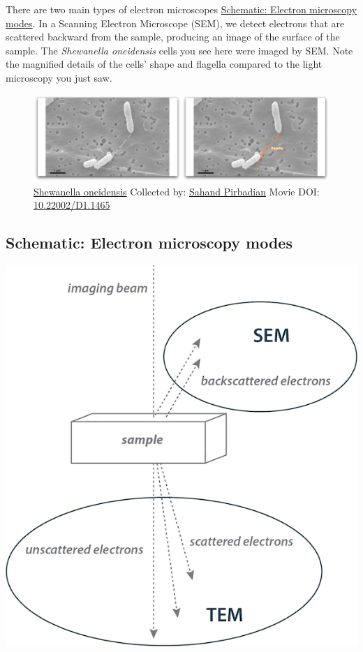\documentclass[]{tufte-book}
\begin{document}
There are two main types of electron microscopes
\protect\hyperlink{Electron_microscopy_modes}{Schematic: Electron
microscopy modes}. In a Scanning Electron Microscope (SEM), we detect
electrons that are scattered backward from the sample, producing an
image of the surface of the sample. The \emph{Shewanella oneidensis}
cells you see here were imaged by SEM. Note the magnified details of the
cells' shape and flagella compared to the light microscopy you just saw.





\begin{figure}
\includegraphics{movie_stills/1_3} \caption[\protect\hyperlink{tree}{Shewanella oneidensis} Collected by:
\protect\hyperlink{sahand_pirbadian}{Sahand Pirbadian} Movie DOI:
\href{https://doi.org/10.22002/D1.1465}{10.22002/D1.1465}]{\protect\hyperlink{tree}{Shewanella oneidensis} Collected by:
\protect\hyperlink{sahand_pirbadian}{Sahand Pirbadian} Movie DOI:
\href{https://doi.org/10.22002/D1.1465}{10.22002/D1.1465}}\label{fig:1-3}
\end{figure}

\hypertarget{Electron_microscopy_modes}{\subsection*{Schematic: Electron
microscopy modes}\label{Electron_microscopy_modes}}

\includegraphics{img/schematics/1_3_1}
\end{document}
